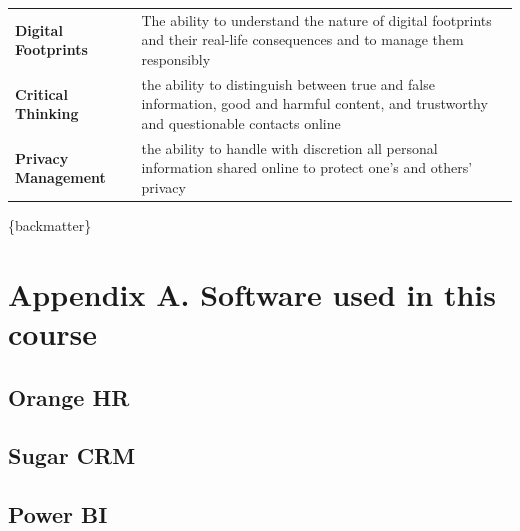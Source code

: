 \documentclass[]{book}
\begin{document}
\begin{longtable}[]{@{}ll@{}}
\begin{minipage}[t]{0.28\columnwidth}\raggedright
\textbf{Digital Footprints}\strut
\end{minipage} & \begin{minipage}[t]{0.67\columnwidth}\raggedright
The ability to understand the nature of digital footprints and their real-life consequences and to manage them responsibly\strut
\end{minipage}\tabularnewline
\begin{minipage}[t]{0.28\columnwidth}\raggedright
\textbf{Critical Thinking}\strut
\end{minipage} & \begin{minipage}[t]{0.67\columnwidth}\raggedright
the ability to distinguish between true and false information, good and harmful content, and trustworthy and questionable contacts online\strut
\end{minipage}\tabularnewline
\begin{minipage}[t]{0.28\columnwidth}\raggedright
\textbf{Privacy Management}\strut
\end{minipage} & \begin{minipage}[t]{0.67\columnwidth}\raggedright
the ability to handle with discretion all personal information shared online to protect one's and others' privacy\strut
\end{minipage}\tabularnewline
\bottomrule
\end{longtable}

\{backmatter\}

\hypertarget{appendix-appendix}{%
\appendix}


\hypertarget{appendix-a.-software-used-in-this-course}{%
\chapter{Appendix A. Software used in this course}\label{appendix-a.-software-used-in-this-course}}

\hypertarget{orange-hr}{%
\section{Orange HR}\label{orange-hr}}

\hypertarget{sugar-crm}{%
\section{Sugar CRM}\label{sugar-crm}}

\hypertarget{power-bi}{%
\section{Power BI}\label{power-bi}}
\end{document}

